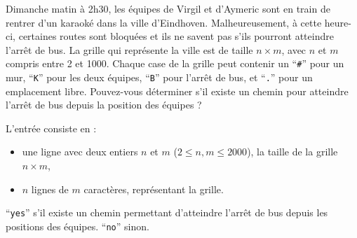 \problemname{\problemyamlname}


Dimanche matin à 2h30, les équipes de Virgil et d'Aymeric sont en train de rentrer d'un karaoké dans la ville d'Eindhoven.
Malheureusement, à cette heure-ci, certaines routes sont bloquées et ils ne savent pas s'ils pourront atteindre l'arrêt de bus. 
La grille qui représente la ville est de taille $n \times m$, avec $n$ et $m$ compris entre 2 et 1000.
Chaque case de la grille peut contenir un ``\verb|#|'' pour un mur, ``\verb|K|'' pour les deux équipes, ``\verb|B|'' pour l'arrêt de bus, et ``\verb|.|'' pour un emplacement libre.
Pouvez-vous déterminer s'il existe un chemin pour atteindre l'arrêt de bus depuis la position des équipes ?

\begin{Input}
	L'entrée consiste en :
	\begin{itemize}
		\item une ligne avec deux entiers $n$ et $m$ ($2 \le n, m \le 2000$), la taille de la grille $n \times m$,
		\item $n$ lignes de $m$ caractères, représentant la grille.
	\end{itemize}
\end{Input}

\begin{Output}
	``\verb|yes|'' s'il existe un chemin permettant d'atteindre l'arrêt de bus depuis les positions des équipes.
	``\verb|no|'' sinon.
\end{Output}
